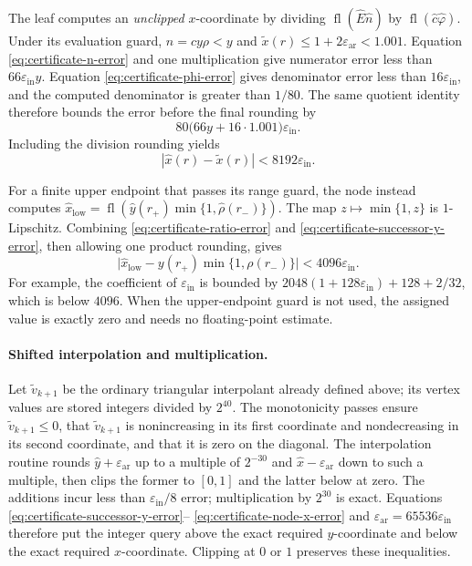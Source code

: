 The leaf computes an \emph{unclipped} $x$-coordinate by dividing
$\operatorname{fl}(\widehat E\widehat n)$ by
$\operatorname{fl}(\widehat c\widehat\varphi)$.
Under its evaluation guard, $n=cy\rho<y$ and
$\widetilde x(r)\le1+2\varepsilon_{\mathrm{ar}}<1.001$.
Equation \eqref{eq:certificate-n-error} and one multiplication give
numerator error less than $66\varepsilon_{\mathrm{in}}y$.
Equation \eqref{eq:certificate-phi-error} gives denominator error less
than $16\varepsilon_{\mathrm{in}}$, and the computed denominator is
greater than $1/80$. The same quotient identity therefore bounds the
error before the final rounding by
\[
 80\bigl(66y+16\cdot1.001\bigr)\varepsilon_{\mathrm{in}}.
\]
Including the division rounding yields
\begin{equation}
 |\widehat x(r)-\widetilde x(r)|
 <8192\varepsilon_{\mathrm{in}}.
 \label{eq:certificate-successor-x-error}
\end{equation}

For a finite upper endpoint that passes its range guard, the node
instead computes
$\widehat x_{\mathrm{low}}
 =\operatorname{fl}(\widehat y(r_+)\min\{1,\widehat\rho(r_-)\})$.
The map $z\mapsto\min\{1,z\}$ is $1$-Lipschitz.
Combining \eqref{eq:certificate-ratio-error} and
\eqref{eq:certificate-successor-y-error}, then allowing one product
rounding, gives
\begin{equation}
 \bigl|\widehat x_{\mathrm{low}}
    -y(r_+)\min\{1,\rho(r_-)\}\bigr|
 <4096\varepsilon_{\mathrm{in}}.
 \label{eq:certificate-node-x-error}
\end{equation}
For example, the coefficient of $\varepsilon_{\mathrm{in}}$ is bounded
by $2048(1+128\varepsilon_{\mathrm{in}})+128+2/32$, which is below
$4096$. When the upper-endpoint guard is not used, the assigned value
is exactly zero and needs no floating-point estimate.

\paragraph{Shifted interpolation and multiplication.}
Let $\widetilde v_{k+1}$ be the ordinary triangular interpolant already
defined above; its vertex values are stored integers divided by $2^{40}$.
The monotonicity passes ensure $\widetilde v_{k+1}\le0$, that
$\widetilde v_{k+1}$ is nonincreasing in its first coordinate and
nondecreasing in its second coordinate, and that it is zero on the diagonal.
The interpolation routine rounds $\widehat y+\varepsilon_{\mathrm{ar}}$
up to a multiple of $2^{-30}$ and
$\widehat x-\varepsilon_{\mathrm{ar}}$ down to such a multiple,
then clips the former to $[0,1]$ and the latter below at zero.
The additions incur less than
$\varepsilon_{\mathrm{in}}/8$ error; multiplication by $2^{30}$ is
exact. Equations \eqref{eq:certificate-successor-y-error}--
\eqref{eq:certificate-node-x-error} and
$\varepsilon_{\mathrm{ar}}=65536\varepsilon_{\mathrm{in}}$
therefore put the integer query above the exact required
$y$-coordinate and below the exact required $x$-coordinate.
Clipping at $0$ or $1$ preserves these inequalities.

